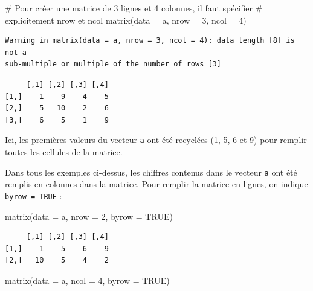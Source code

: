 \documentclass[
  french,
  a4paper,
  DIV=11,
  numbers=noendperiod,
  oneside]{scrreprt}
\newenvironment{Shaded}{}{}
\newcommand{\AttributeTok}[1]{\textcolor[rgb]{0.84,0.23,0.29}{#1}}
\newcommand{\CommentTok}[1]{\textcolor[rgb]{0.42,0.45,0.49}{#1}}
\newcommand{\ConstantTok}[1]{\textcolor[rgb]{0.00,0.36,0.77}{#1}}
\newcommand{\DecValTok}[1]{\textcolor[rgb]{0.00,0.36,0.77}{#1}}
\newcommand{\FunctionTok}[1]{\textcolor[rgb]{0.44,0.26,0.76}{#1}}
\newcommand{\NormalTok}[1]{\textcolor[rgb]{0.14,0.16,0.18}{#1}}
\begin{document}
\begin{tcolorbox}
\begin{Shaded}
\begin{Highlighting}[]
\CommentTok{\# Pour créer une matrice de 3 lignes et 4 colonnes, il faut spécifier }
\CommentTok{\# explicitement nrow et ncol}
\FunctionTok{matrix}\NormalTok{(}\AttributeTok{data =}\NormalTok{ a, }\AttributeTok{nrow =} \DecValTok{3}\NormalTok{, }\AttributeTok{ncol =} \DecValTok{4}\NormalTok{)}
\end{Highlighting}
\end{Shaded}

\begin{verbatim}
Warning in matrix(data = a, nrow = 3, ncol = 4): data length [8] is not a
sub-multiple or multiple of the number of rows [3]
\end{verbatim}

\begin{verbatim}
     [,1] [,2] [,3] [,4]
[1,]    1    9    4    5
[2,]    5   10    2    6
[3,]    6    5    1    9
\end{verbatim}

Ici, les premières valeurs du vecteur \texttt{a} ont été recyclées (1,
5, 6 et 9) pour remplir toutes les cellules de la matrice.

Dans tous les exemples ci-dessus, les chiffres contenus dans le vecteur
\texttt{a} ont été remplis en colonnes dans la matrice. Pour remplir la
matrice en lignes, on indique \texttt{byrow\ =\ TRUE} :

\begin{Shaded}
\begin{Highlighting}[]
\FunctionTok{matrix}\NormalTok{(}\AttributeTok{data =}\NormalTok{ a, }\AttributeTok{nrow =} \DecValTok{2}\NormalTok{, }\AttributeTok{byrow =} \ConstantTok{TRUE}\NormalTok{)}
\end{Highlighting}
\end{Shaded}

\begin{verbatim}
     [,1] [,2] [,3] [,4]
[1,]    1    5    6    9
[2,]   10    5    4    2
\end{verbatim}

\begin{Shaded}
\begin{Highlighting}[]
\FunctionTok{matrix}\NormalTok{(}\AttributeTok{data =}\NormalTok{ a, }\AttributeTok{ncol =} \DecValTok{4}\NormalTok{, }\AttributeTok{byrow =} \ConstantTok{TRUE}\NormalTok{)}
\end{Highlighting}
\end{Shaded}


\end{tcolorbox}
\end{document}
